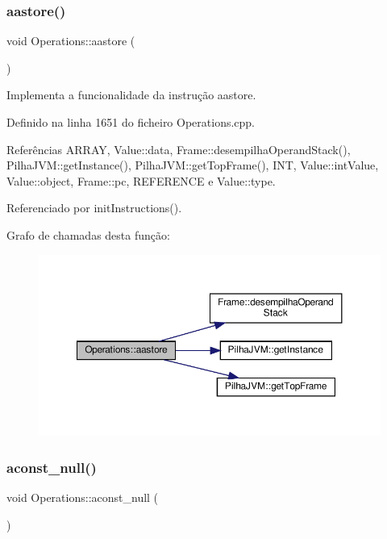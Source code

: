 \subsubsection{\texorpdfstring{aastore()}{aastore()}}
{\footnotesize\ttfamily void Operations\+::aastore (\begin{DoxyParamCaption}{ }\end{DoxyParamCaption})\hspace{0.3cm}{\ttfamily [private]}}



Implementa a funcionalidade da instrução aastore. 



Definido na linha 1651 do ficheiro Operations.\+cpp.



Referências A\+R\+R\+AY, Value\+::data, Frame\+::desempilha\+Operand\+Stack(), Pilha\+J\+V\+M\+::get\+Instance(), Pilha\+J\+V\+M\+::get\+Top\+Frame(), I\+NT, Value\+::int\+Value, Value\+::object, Frame\+::pc, R\+E\+F\+E\+R\+E\+N\+CE e Value\+::type.



Referenciado por init\+Instructions().

Grafo de chamadas desta função\+:\nopagebreak
\begin{figure}[H]
\begin{center}
\leavevmode
\includegraphics[width=350pt]{classOperations_a60b30bd84b2d59334e735f0adda6febe_cgraph}
\end{center}
\end{figure}
\mbox{\label{classOperations_af51ec8a98d9ed3167da0d8ac6279a1cd}} 
\subsubsection{\texorpdfstring{aconst\+\_\+null()}{aconst\_null()}}
{\footnotesize\ttfamily void Operations\+::aconst\+\_\+null (\begin{DoxyParamCaption}{ }\end{DoxyParamCaption})\hspace{0.3cm}{\ttfamily [private]}}



